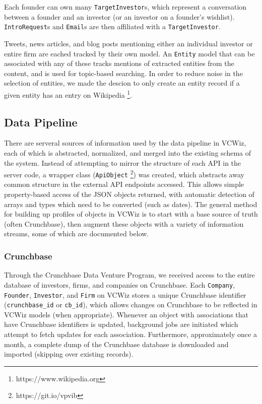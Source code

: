 Each founder can own many \texttt{TargetInvestor}s, which represent a conversation between a founder and an investor (or an investor on a founder's wishlist). \texttt{IntroRequest}s and \texttt{Email}s are then affiliated with a \texttt{TargetInvestor}.

Tweets, news articles, and blog posts mentioning either an individual investor or entire firm are eached tracked by their own model. An \texttt{Entity} model that can be associated with any of these tracks mentions of extracted entities from the content, and is used for topic-based searching. In order to reduce noise in the selection of entities, we made the descion to only create an entity record if a given entity has an entry on Wikipedia \footnote{https://www.wikipedia.org}.

\subsection{Data Pipeline}

There are serveral sources of information used by the data pipeline in VCWiz, each of which is abstracted, normalized, and merged into the existing schema of the system.  Instead of attempting to mirror the structure of each API in the server code, a wrapper class (\texttt{ApiObject} \footnote{https://git.io/vpvib}) was created, which abstracts away common structure in the external API endpoints accessed. This allows simple property-based access of the JSON objects returned, with automatic detection of arrays and types which need to be converted (such as dates). The general method for building up profiles of objects in VCWiz is to start with a base source of truth (often Crunchbase), then augment these objects with a variety of information streams, some of which are documented below.

\subsubsection{Crunchbase}

Through the Crunchbase Data Venture Program, we received access to the entire database of investors, firms, and companies on Crunchbase. Each \texttt{Company}, \texttt{Founder}, \texttt{Investor}, and \texttt{Firm} on VCWiz stores a unique Crunchbase identifier (\texttt{crunchbase\_id} or \texttt{cb\_id}), which allows changes on Crunchbase to be reflected in VCWiz models (when appropriate). Whenever an object with associations that have Crunchbase identifiers is updated, background jobs are initiated which attempt to fetch updates for each association. Furthermore, approximately once a month, a complete dump of the Crunchbase database is downloaded and imported (skipping over existing records).

